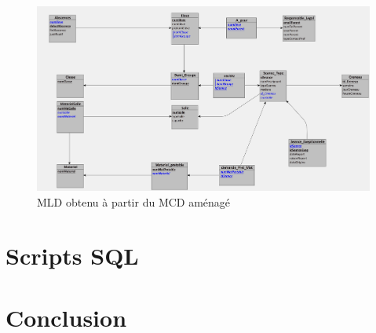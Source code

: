 \documentclass[12pt,french,titlepage]{article}
\begin{document}
	  \begin{figure}[H]
	      \centering
	      \includegraphics[scale=0.1]{./mld_amenage.jpg}
	      \caption{MLD obtenu à partir du MCD aménagé}
	      
	   
	      
	  \end{figure}
	  
	  \section{Scripts SQL}
	  
	  
	  
	  \section{Conclusion}
    

	
	
	
\end{document}

